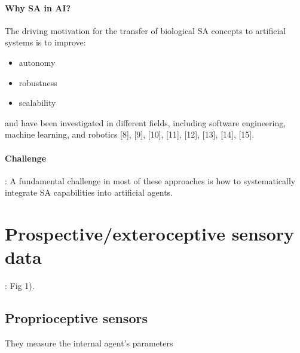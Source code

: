 \documentclass{article}
\begin{document}
			\paragraph{Why SA in AI?} The driving motivation for the transfer of biological SA concepts
			to artificial systems is to improve:
			\begin{itemize}
				\item autonomy
				\item robustness
				\item scalability
			\end{itemize}
			and have been investigated in different fields, including software engineering, machine learning, and robotics \citet{regazzoni-2020-multi-sensorial-generative-and-descriptive-self-awareness-models-for-autonomous-systems}[8],
			\citet{regazzoni-2020-multi-sensorial-generative-and-descriptive-self-awareness-models-for-autonomous-systems}[9], \citet{regazzoni-2020-multi-sensorial-generative-and-descriptive-self-awareness-models-for-autonomous-systems}[10], \citet{regazzoni-2020-multi-sensorial-generative-and-descriptive-self-awareness-models-for-autonomous-systems}[11], \citet{regazzoni-2020-multi-sensorial-generative-and-descriptive-self-awareness-models-for-autonomous-systems}[12], \citet{regazzoni-2020-multi-sensorial-generative-and-descriptive-self-awareness-models-for-autonomous-systems}[13], \citet{regazzoni-2020-multi-sensorial-generative-and-descriptive-self-awareness-models-for-autonomous-systems}[14], \citet{regazzoni-2020-multi-sensorial-generative-and-descriptive-self-awareness-models-for-autonomous-systems}[15]. 
			\paragraph{Challenge}: A fundamental challenge in most of these approaches is how to systematically integrate SA capabilities into artificial agents.
		
	\section{Prospective/exteroceptive sensory data}: 
		\cite{regazzoni-2020-multi-sensorial-generative-and-descriptive-self-awareness-models-for-autonomous-systems} Fig 1).
		\subsection{Proprioceptive sensors} 
		They measure the internal agent's parameters
		
\end{document}
